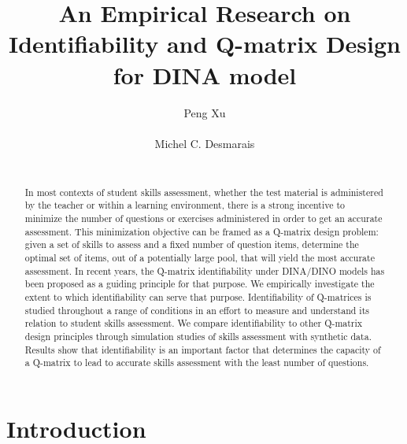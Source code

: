 \documentclass{edm_template-no-copyright}
\begin{document}
\title{An Empirical Research on Identifiability and Q-matrix Design for DINA model}
\author{
\alignauthor
Peng Xu\\
       \\
\alignauthor
Michel C. Desmarais\\
       \\
}
\maketitle

\begin{abstract}
In most contexts of student skills assessment, whether the test material is administered by the teacher or within a learning environment, there is a strong incentive to minimize the number of questions or exercises administered in order to get an accurate assessment.  This minimization objective can be framed as a Q-matrix design problem: given a set of skills to assess and a fixed number of question items, determine the optimal set of items, out of a potentially large pool, that will yield the most accurate assessment.  In recent years, the Q-matrix identifiability under DINA/DINO models has been proposed as a guiding principle for that purpose.  We empirically investigate the extent to which identifiability can serve that purpose. Identifiability of Q-matrices is studied throughout a range of conditions in an effort to measure and understand its relation to student skills assessment.  We compare identifiability to other Q-matrix design principles through simulation studies of skills assessment with synthetic data.  Results show that identifiability is an important factor that determines the capacity of a Q-matrix to lead to accurate skills assessment with the least number of questions.
\end{abstract}

\section{Introduction}

\end{document}
